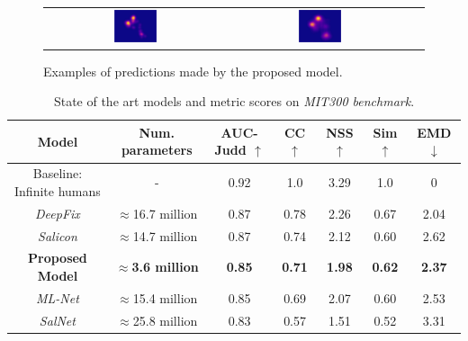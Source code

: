 \documentclass[10pt,twocolumn,letterpaper]{article}
\begin{document}
\begin{figure}
\begin{center}
\begin{tabular} {ccc}
    \includegraphics[width=0.25\textwidth]{./img/sign_gt.jpg} &
    \includegraphics[width=0.25\textwidth]{./img/sign_m.jpg}\\
    \end{tabular}
\end{center}
    \caption{Examples of predictions made by the proposed model.}
    \label{fig:preds}
\end{figure}

\begin{table}
	\small
    \begin{center}
    \label{table:results}
    \caption{State of the art models and metric scores on
    \emph{MIT300 benchmark}.}
    \begin{tabular}{|c|c|c|c|c|c|c|}
        \hline
        Model & Num. parameters & AUC-Judd $\uparrow$ & CC $\uparrow$
            & NSS $\uparrow$ & Sim $\uparrow$ & EMD $\downarrow$\\
        \hline
        Baseline: Infinite humans & - & 0.92 & 1.0 & 3.29 & 1.0 & 0\\
        \hline
        \emph{DeepFix} & $\approx$16.7 million & 0.87 & 0.78
            & 2.26 & 0.67 & 2.04\\
        \hline
        \emph{Salicon} & $\approx$14.7 million & 0.87 & 0.74 & 2.12
            & 0.60 & 2.62\\
        \hline
        \textbf{Proposed Model} & $\approx$\textbf{3.6 million}
            & \textbf{0.85} &
        \textbf{0.71} & \textbf{1.98} & \textbf{0.62} & \textbf{2.37}\\
        \hline
        \emph{ML-Net} & $\approx$15.4 million & 0.85 & 0.69 & 2.07 & 0.60
            & 2.53\\
        \hline
        \emph{SalNet} & $\approx$25.8 million & 0.83 & 0.57 & 1.51
            & 0.52 & 3.31\\
        \hline
    \end{tabular}
    \end{center}
\end{table}
\end{document}
